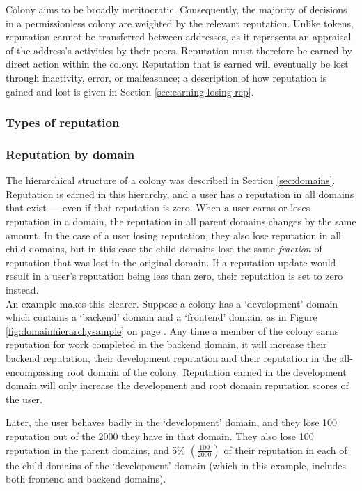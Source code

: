 Colony aims to be broadly meritocratic. Consequently, the majority of decisions in a permissionless colony are weighted by the relevant reputation. Unlike tokens, reputation cannot be transferred between addresses, as it represents an appraisal of the address's activities by their peers. Reputation must therefore be earned by direct action within the colony. Reputation that is earned will eventually be lost through inactivity, error, or malfeasance; a description of how reputation is gained and lost is given in Section \ref{sec:earning-losing-rep}.

\subsubsection{Types of reputation}

\subsubsection*{Reputation by domain}\label{sec:rep-by-domain}

The hierarchical structure of a colony was described in Section \ref{sec:domains}. Reputation is earned in this hierarchy, and a user has a reputation in all domains that exist --- even if that reputation is zero. When a user earns or loses reputation in a domain, the reputation in all parent domains changes by the same amount. In the case of a user losing reputation, they also lose reputation in all child domains, but in this case the child domains lose the same \textit{fraction} of reputation that was lost in the original domain. If a reputation update would result in a user's reputation being less than zero, their reputation is set to zero instead. \\

An example makes this clearer. Suppose a colony has a `development' domain which contains a `backend' domain and a `frontend' domain, as in Figure \ref{fig:domainhierarchysample} on page \pageref{fig:domainhierarchysample}. Any time a member of the colony earns reputation for work completed in the backend domain, it will increase their backend reputation, their development reputation and their reputation in the all-encompassing root domain of the colony. Reputation earned in the development domain will only increase the development and root domain reputation scores of the user.

Later, the user behaves badly in the `development' domain, and they lose 100 reputation out of the 2000 they have in that domain. They also lose 100 reputation in the parent domains, and 5\% $\left(\frac{100}{2000}\right)$ of their reputation in each of the child domains of the `development' domain (which in this example, includes both frontend and backend domains).

